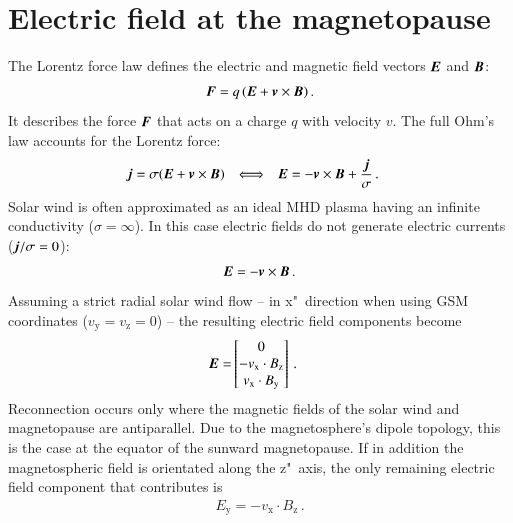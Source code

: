 \section{Electric field at the magnetopause}
\label{sec:electric_field_at_the_magnetopause}
The Lorentz force law defines the electric and magnetic field vectors $\boldsymbol{E}$ and $\boldsymbol{B}$:
\begin{align}
	\boldsymbol{F} = q\,(\boldsymbol{E} + \boldsymbol{v} \times \boldsymbol{B})	\,.
\end{align}
It describes the force $\boldsymbol{F}$ that acts on a charge $q$ with velocity $v$. The full Ohm's law accounts for the Lorentz force:
\begin{align*}
	\boldsymbol{j} &= \sigma(\boldsymbol{E} + \boldsymbol{v} \times \boldsymbol{B})	& \Longleftrightarrow	&	&	\boldsymbol{E} &= - \boldsymbol{v} \times \boldsymbol{B} + \frac{\boldsymbol{j}}{\sigma}	\,.
\end{align*}
Solar wind is often approximated as an ideal MHD plasma having an infinite conductivity ($\sigma = \infty$). In this case electric fields do not generate electric currents ($\boldsymbol{j} / \sigma = 0$):
\begin{align}
	\boldsymbol{E} = - \boldsymbol{v} \times \boldsymbol{B}	\,.
\end{align}
Assuming a strict radial solar wind flow -- in x"~direction when using GSM coordinates ($v_\text{y} = v_\text{z} = 0$) -- the resulting electric field components become
\begin{align}
	\boldsymbol{E} =& \begin{bmatrix}
		0\\
		- v_\text{x} \cdot B_\text{z}\\
		v_\text{x} \cdot B_\text{y}
	\end{bmatrix}	\,.
\end{align}
Reconnection occurs only where the magnetic fields of the solar wind and magnetopause are antiparallel. Due to the magnetosphere's dipole topology, this is the case at the equator of the sunward magnetopause. If in addition the magnetospheric field is orientated along the z"~axis, the only remaining electric field component that contributes is
\begin{align}
	E_\text{y} = - v_\text{x} \cdot B_\text{z}	\,.
\end{align}

